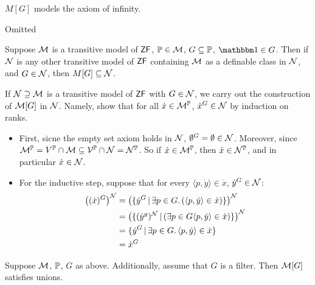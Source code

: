 \documentclass{article}
\begin{document}
\begin{corr}{}
    $M[G]$ models the axiom of infinity.
\end{corr}
\proof Omitted \endproof
\begin{fancylem}
    Suppose $\mathcal{M}$ is a transitive model of $\mathsf{ZF}$, $\mathbb{P} \in \mathcal{M}$, $G \subseteq \mathbb{P}$, $\bbone \in G$. Then if $\mathcal{N}$ is any other transitive model of $\mathsf{ZF}$ containing $\mathcal{M}$ as a definable class in $\mathcal{N}$, and $G \in \mathcal{N}$, then $M[G] \subseteq \mathcal{N}$.
\end{fancylem}
\proof If $\mathcal{N} \supseteq \mathcal{M}$ is a transitive model of $\mathsf{ZF}$ with $G \in \mathcal{N}$, we carry out the construction of $\mathcal{M}[G]$ in $\mathcal{N}$. Namely, show that for all $\dot{x} \in \mathcal{M}^{\mathbb{P}}$, $\dot{x}^{G} \in \mathcal{N}$ by induction on ranks. \begin{itemize}
    \item First, sicne the empty set axiom holds in $\mathcal{N}$, $\emptyset^{G} = \emptyset \in \mathcal{N}$.\gap
          Moreover, since $\mathcal{M}^{\mathbb{P}} = V^{\mathbb{P}} \cap \mathcal{M} \subseteq \mathcal{V}^{\mathbb{P}} \cap \mathcal{N} = \mathcal{N}^{\mathbb{P}}$. So if $\dot{x} \in \mathcal{M}^{\mathbb{P}}$, then $\dot{x} \in \mathcal{N}^{\mathbb{P}}$, and in particular $\dot{x} \in \mathcal{N}$.
    \item For the inductive step, suppose that for every $\langle p, \dot{y}\rangle \in \dot{x}$, $\dot{y}^{G} \in \mathcal{N}$:
          \begin{align*}
              \left( (\dot{x})^{G} \right)^{\mathcal{N}} & = \left( \{\dot{y}^{G} \, | \, \exists p \in G. \, (\langle p, \dot{y} \rangle \in \dot{x}) \}\right)^{\mathcal{N}}      \\
                                                   & = \left(\{ (\dot{y}^{g})^{\mathcal{N}} \, | \, (\exists p \in G \langle p, \dot{y} \rangle \in \dot{x})\}\right)^{\mathcal{N}} \\
                                                   & = \{ \dot{y}^{G} \, | \, \exists p \in G. \, \langle p, \dot{y} \rangle \in \dot{x} \}                             \\
                                                   & = \dot{x}^{G}
          \end{align*}
\end{itemize}
\endproof
\begin{fancylem}{}
    Suppose $\mathcal{M}$, $\mathbb{P}$, $G$ as above. Additionally, assume that $G$ is a filter. Then $\mathcal{M}[G]$ satisfies unions.
\end{fancylem}
\end{document}
